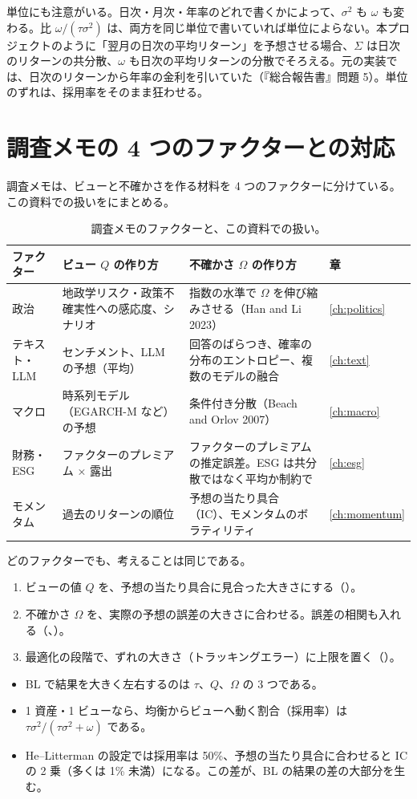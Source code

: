 単位にも注意がいる。日次・月次・年率のどれで書くかによって、$\sigma^2$ も $\omega$ も変わる。比 $\omega/(\tau\sigma^2)$ は、両方を同じ単位で書いていれば単位によらない。本プロジェクトのように「翌月の日次の平均リターン」を予想させる場合、$\Sigma$ は日次のリターンの共分散、$\omega$ も日次の平均リターンの分散でそろえる。元の実装では、日次のリターンから年率の金利を引いていた（『総合報告書』問題 5）。単位のずれは、採用率をそのまま狂わせる。

\section{調査メモの 4 つのファクターとの対応}

調査メモは、ビューと不確かさを作る材料を 4 つのファクターに分けている。この資料での扱いをにまとめる。

\begin{table}[htbp]
\centering
\caption{調査メモのファクターと、この資料での扱い。}
\label{tab:factors}
\small
\begin{tabular}{p{1.8cm}p{4.2cm}p{5.0cm}p{1.4cm}}
\toprule
ファクター & ビュー $Q$ の作り方 & 不確かさ $\Omega$ の作り方 & 章 \\
\midrule
政治 & 地政学リスク・政策不確実性への感応度、シナリオ & 指数の水準で $\Omega$ を伸び縮みさせる（Han and Li 2023） & \ref{ch:politics} \\
テキスト・LLM & センチメント、LLM の予想（平均） & 回答のばらつき、確率の分布のエントロピー、複数のモデルの融合 & \ref{ch:text} \\
マクロ & 時系列モデル（EGARCH-M など）の予想 & 条件付き分散（Beach and Orlov 2007） & \ref{ch:macro} \\
財務・ESG & ファクターのプレミアム × 露出 & ファクターのプレミアムの推定誤差。ESG は共分散ではなく平均か制約で & \ref{ch:esg} \\
モメンタム & 過去のリターンの順位 & 予想の当たり具合（IC）、モメンタムのボラティリティ & \ref{ch:momentum} \\
\bottomrule
\end{tabular}
\end{table}

どのファクターでも、考えることは同じである。

\begin{enumerate}
\item ビューの値 $Q$ を、予想の当たり具合に見合った大きさにする（）。
\item 不確かさ $\Omega$ を、実際の予想の誤差の大きさに合わせる。誤差の相関も入れる（、）。
\item 最適化の段階で、ずれの大きさ（トラッキングエラー）に上限を置く（）。
\end{enumerate}

\begin{keybox}[この章のまとめ]
\begin{itemize}
\item BL で結果を大きく左右するのは $\tau$、$Q$、$\Omega$ の 3 つである。
\item 1 資産・1 ビューなら、均衡からビューへ動く割合（採用率）は $\tau\sigma^2/(\tau\sigma^2+\omega)$ である。
\item He--Litterman の設定では採用率は 50\%、予想の当たり具合に合わせると IC の 2 乗（多くは 1\% 未満）になる。この差が、BL の結果の差の大部分を生む。
\end{itemize}
\end{keybox}
